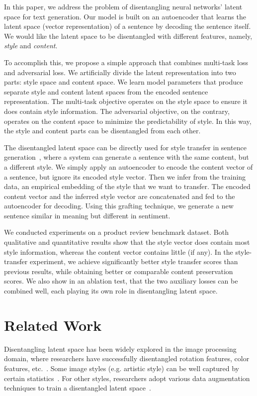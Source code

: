 \documentclass[11pt,a4paper]{article}
\begin{document}
In this paper, we address the problem of disentangling neural networks' latent space for text generation. Our model is built on an autoencoder that learns the latent space (vector representation) of a sentence by decoding the sentence itself. We would like the latent space to be disentangled with different features, namely, \textit{style} and \textit{content}.

To accomplish this, we propose a simple approach that combines multi-task loss and adversarial loss. We artificially divide the latent representation into two parts: style space and content space.
We learn model parameters that produce separate style and content latent spaces from the encoded sentence representation. The multi-task objective operates on the style space to ensure it does contain style information.
The adversarial objective, on the contrary, operates on the content space to minimize the predictability of style. In this way, the style and content parts can be disentangled from each other.

The disentangled latent space can be directly used for style transfer in sentence generation~\cite{fu2017style,shen2017style}, where a system can generate a sentence with the same content, but a different style. We simply apply an autoencoder to encode the content vector of a sentence, but ignore its encoded style vector. Then we infer from the training data, an empirical embedding of the style that we want to transfer. The encoded content vector and the inferred style vector are concatenated and fed to the autoencoder for decoding. Using this grafting technique, we generate a new sentence similar in meaning but different in sentiment.

We conducted experiments on a product review benchmark dataset. Both qualitative and quantitative results show that the style vector does contain most style information, whereas the content vector contains little (if any). In the style-transfer experiment, we achieve significantly better style transfer scores than previous results, while obtaining better or comparable content preservation scores.  We also show in an ablation test, that the two auxiliary losses can be combined well, each playing its own role in disentangling latent space.


\section{Related Work}


Disentangling latent space has been widely explored in the image processing domain, where researchers have successfully disentangled rotation features, color features, etc.~\cite{chen2016infogan,luan2017deep}. Some image styles (e.g. artistic style) can be well captured by certain statistics~\cite{gatys2016image}. For other styles, researchers adopt various data augmentation techniques to train a disentangled latent space~\cite{champandard2016semantic,kulkarni2015deep}.
\end{document}
